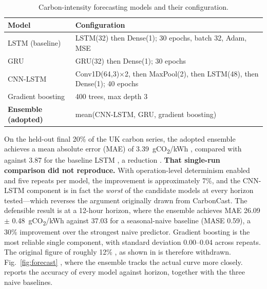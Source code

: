 \documentclass[12pt,a4paper]{article}
\providecommand{\DIFaddtex}[1]{{\protect\color{blue} \sf #1}} %
\providecommand{\DIFdeltex}[1]{{\protect\color{red} \scriptsize #1}} %
\providecommand{\DIFaddbegin}{} %
\providecommand{\DIFaddend}{} %
\providecommand{\DIFdelbegin}{} %
\providecommand{\DIFdelend}{} %
\providecommand{\DIFadd}[1]{\texorpdfstring{\DIFaddtex{#1}}{#1}} %
\providecommand{\DIFdel}[1]{\texorpdfstring{\DIFdeltex{#1}}{}} %
\providecommand{\DIFscaledelfig}{0.5}
\newlength{\DIFdelgraphicswidth} %
\newlength{\DIFdelgraphicsheight} %
\providecommand{\DIFaddincludegraphics}[2][]{{\color{blue}\fbox{\DIFOincludegraphics[#1]{#2}}}} %
\providecommand{\DIFdelincludegraphics}[2][]{%
\sbox{\DIFdelgraphicsbox}{\DIFOincludegraphics[#1]{#2}}%
\settoboxwidth{\DIFdelgraphicswidth}{\DIFdelgraphicsbox} %
\settoboxtotalheight{\DIFdelgraphicsheight}{\DIFdelgraphicsbox} %
\scalebox{\DIFscaledelfig}{%
\parbox[b]{\DIFdelgraphicswidth}{\usebox{\DIFdelgraphicsbox}\\[-\baselineskip] \rule{\DIFdelgraphicswidth}{0em}}\llap{\resizebox{\DIFdelgraphicswidth}{\DIFdelgraphicsheight}{%
\setlength{\unitlength}{\DIFdelgraphicswidth}%
\begin{picture}(1,1)%
\thicklines\linethickness{2pt} %
{\color[rgb]{1,0,0}\put(0,0){\framebox(1,1){}}}%
{\color[rgb]{1,0,0}\put(0,0){\line( 1,1){1}}}%
{\color[rgb]{1,0,0}\put(0,1){\line(1,-1){1}}}%
\end{picture}%
}\hspace*{3pt}}} %
} %
\DeclareRobustCommand{\DIFaddbegin}{\DIFOaddbegin \let\includegraphics\DIFaddincludegraphics} %
\DeclareRobustCommand{\DIFaddend}{\DIFOaddend \let\includegraphics\DIFOincludegraphics} %
\DeclareRobustCommand{\DIFdelbegin}{\DIFOdelbegin \let\includegraphics\DIFdelincludegraphics} %
\DeclareRobustCommand{\DIFdelend}{\DIFOaddend \let\includegraphics\DIFOincludegraphics} %
\begin{document}
\begin{table}[H]\centering \footnotesize
\caption{Carbon-intensity forecasting models and their configuration.}\label{tab:forecast}
\begin{tabular}{@{}lp{5.0cm}@{}}
\toprule Model & Configuration \\ \midrule
LSTM (baseline) & LSTM(32) then Dense(1); 30 epochs, batch 32, Adam, MSE \\
GRU & GRU(32) then Dense(1); 30 epochs \\
CNN-LSTM & Conv1D(64,3)$\times$2, then MaxPool(2), then LSTM(48), then Dense(1); 40 epochs \\
Gradient boosting & 400 trees, max depth 3 \\
\textbf{Ensemble (adopted)} & mean(CNN-LSTM, GRU, gradient boosting) \\
\bottomrule
\end{tabular}
\end{table}

On the held-out final 20\% of the UK carbon series, the adopted ensemble achieves a mean absolute error (MAE)
of 3.39~gCO\textsubscript{2}/kWh \DIFdelbegin \DIFdel{, compared with }\DIFdelend \DIFaddbegin \DIFadd{against }\DIFaddend 3.87 for the baseline LSTM\DIFdelbegin \DIFdel{, a reduction }\DIFdelend \DIFaddbegin \DIFadd{. \textbf{That single-run comparison did
not reproduce.} With operation-level determinism enabled and five repeats per model, the improvement is
approximately 7\%, and the CNN-LSTM component is in fact the \emph{worst} of the candidate models at every
horizon tested---which reverses the argument originally drawn from CarbonCast. The defensible result is at a
12-hour horizon, where the ensemble achieves MAE 26.09 $\pm$ 0.48~gCO\textsubscript{2}/kWh against 37.03 for a
seasonal-naive baseline (MASE 0.59), a 30\% improvement over the strongest naive predictor. Gradient boosting
is the most reliable single component, with standard deviation 0.00--0.04 across repeats. The original figure
}\DIFaddend of roughly 12\% \DIFdelbegin \DIFdel{,
as shown in }\DIFdelend \DIFaddbegin \DIFadd{is therefore withdrawn. }\DIFaddend Fig.~\ref{fig:forecast} \DIFdelbegin \DIFdel{, where the ensemble tracks the actual curve more closely.
}\DIFdelend \DIFaddbegin \DIFadd{reports the accuracy of every model against
horizon, together with the three naive baselines.
}
\end{document}
